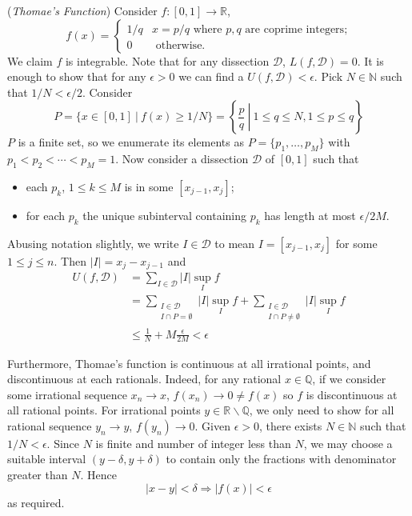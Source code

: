 \documentclass[10pt, a4paper, twoside]{report}
\begin{document}
\begin{example}
    (\emph{Thomae's Function}) Consider \(f:[0,1]\to\mathbb{R}\),
    \[f(x)=\begin{cases}
        1/q & x=p/q \text{ where \(p,q\) are coprime integers;}\\
        0 & \text{ otherwise.} 
    \end{cases}\]
    We claim \(f\) is integrable. Note that for any dissection \(\mathcal{D}\), \(L(f,\mathcal{D})=0\). It is enough to show that for any \(\epsilon>0\) we can find a \(U(f,\mathcal{D})<\epsilon\). Pick \(N\in\mathbb{N}\) such that \(1/N<\epsilon/2\). Consider 
    \[P=\{x\in[0,1]\:|\:f(x)\geq 1/N\}=\left\{\left.\frac pq\:\right|\:1\leq q\leq N,1\leq p\leq q\right\}\]
    \(P\) is a finite set, so we enumerate its elements as \(P=\{p_1,\ldots,p_M\}\) with \(p_1<p_2<\cdots<p_M=1\). Now consider a dissection \(\mathcal{D}\) of \([0,1]\) such that 
    \begin{itemize}
        \item each \(p_k\), \(1\leq k\leq M\) is in some \([x_{j-1},x_j]\);
        \item for each \(p_k\) the unique subinterval containing \(p_k\) has length at most \(\epsilon/2M\).
    \end{itemize}
    Abusing notation slightly, we write \(I\in\mathcal{D}\) to mean \(I=[x_{j-1},x_j]\) for some \(1\leq j\leq n\). Then \(|I|=x_{j}-x_{j-1}\) and 
    \begin{align*}
        U(f,\mathcal{D})&=\sum_{I\in\mathcal{D}}|I|\sup_I f \\
        &=\sum_{\substack{I\in\mathcal{D}\\I\cap P=\emptyset}}|I|\sup_I f+\sum_{\substack{I\in\mathcal{D}\\I\cap P\neq\emptyset}}|I|\sup_I f \\
        &\leq \frac 1N+M\frac{\epsilon}{2M}<\epsilon
    \end{align*}

    Furthermore, Thomae's function is continuous at all irrational points, and discontinuous at each rationals. Indeed, for any rational \(x\in\mathbb{Q}\), if we consider some irrational sequence \(x_n\to x\), \(f(x_n)\to 0\neq f(x)\) so \(f\) is discontinuous at all rational points. For irrational points \(y\in\mathbb{R}\backslash\mathbb{Q}\), we only need to show for all rational sequence \(y_n\to y\), \(f(y_n)\to 0\). Given \(\epsilon>0\), there exists \(N\in\mathbb{N}\) such that \(1/N<\epsilon\). Since \(N\) is finite and number of integer less than \(N\), we may choose a suitable interval \((y-\delta,y+\delta)\) to contain only the fractions with denominator greater than \(N\). Hence
    \[|x-y|<\delta\Rightarrow|f(x)|<\epsilon\]
    as required.
\end{example}
\end{document}
